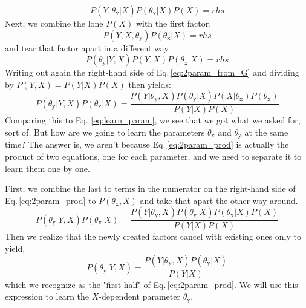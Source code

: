 \documentclass[]{report}
\begin{document}
\begin{equation}
P(Y, \theta_\mathrm{y}|X)P(\theta_\mathrm{x}|X)P(X) = rhs
\end{equation}
Next, we combine the lone $P(X)$ with the first factor,
\begin{equation}
P(Y, X, \theta_\mathrm{y})P(\theta_\mathrm{x}|X) = rhs
\end{equation}
and tear that factor apart in a different way.
\begin{equation} \label{eq:2param_lhs}
P(\theta_\mathrm{y}|Y, X)P(Y, X)P(\theta_\mathrm{x}|X) = rhs
\end{equation}
Writing out again the right-hand side of Eq.\,\ref{eq:2param_from_G} and dividing by $P(Y, X)=P(Y|X)P(X)$ then yields:
\begin{equation} \label{eq:2param_prod}
P(\theta_\mathrm{y}|Y, X)P(\theta_\mathrm{x}|X) = \frac{P(Y|\theta_\mathrm{y}, X)P(\theta_\mathrm{y}|X)P(X|\theta_\mathrm{x})P(\theta_\mathrm{x})}{P(Y|X)P(X)}
\end{equation}
Comparing this to Eq. \ref{eq:learn_param}, we see that we got what we asked for, sort of. But how are we going to learn the parameters $\theta_\mathrm{x}$ and $\theta_\mathrm{y}$ at the same time? The answer is, we aren't because Eq.\,\ref{eq:2param_prod} is actually the product of two equations, one for each parameter, and we need to separate it to learn them one by one.

First, we combine the last to terms in the numerator on the right-hand side of Eq.\,\ref{eq:2param_prod} to $P(\theta_\mathrm{x}, X)$ and take that apart the other way around.
\begin{equation}
P(\theta_\mathrm{y}|Y, X)P(\theta_\mathrm{x}|X) = \frac{P(Y|\theta_\mathrm{y}, X)P(\theta_\mathrm{y}|X)P(\theta_\mathrm{x}|X)P(X)}{P(Y|X)P(X)}
\end{equation}
Then we realize that the newly created factors cancel with existing ones only to yield,
\begin{equation} \label{eq:2param_Y}
P(\theta_\mathrm{y}|Y, X) = \frac{P(Y|\theta_\mathrm{y}, X)P(\theta_\mathrm{y}|X)}{P(Y|X)}
\end{equation}
which we recognize as the "first half" of Eq.\,\ref{eq:2param_prod}. We will use this expression to learn the $X$-dependent parameter $\theta_\mathrm{y}$.
\end{document}
